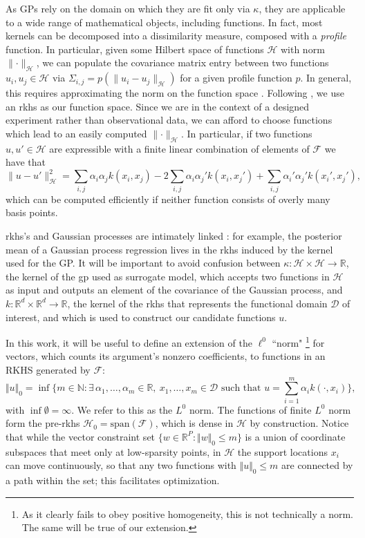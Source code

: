 \documentclass{article}
\newcommand{\N}{\mathbb{N}}
\newcommand{\R}{\mathbb{R}}
\newcommand{\D}{\mathcal{D}} %
\newcommand{\F}{\mathcal{F}}
\newcommand{\Hs}{\mathcal{H}}
\newcommand{\norm}[1]{\lVert #1 \rVert}
\newcommand{\kernelH}{k}
\newcommand{\kernelGP}{\kappa}
\newcommand{\vu}{u}
\begin{document}
As GPs rely on the domain on which they are fit only via $\kernelGP$, they are applicable to a wide range of mathematical objects, including functions.
In fact, most kernels can be decomposed into a dissimilarity measure, composed with a \emph{profile} function. In particular, given some Hilbert space of functions $\Hs$ with norm $\norm{\cdot}_\Hs$, we can populate the covariance matrix entry between two functions $\vu_i,\vu_j\in\Hs$ via $\Sigma_{i,j} = p(\norm{\vu_i - \vu_j}_\Hs)$ for a given profile function $p$.
In general, this requires approximating the norm on the function space \citep{muehlenstaedt2017computer,betancourt2020fungp,damiano2022automatic}.
Following \cite{vien2018bayesian}, we use an \gls{rkhs} as our function space.
Since we are in the context of a designed experiment rather than observational data, we can afford to choose functions which lead to an easily computed $\norm{\cdot}_\Hs$.
In particular, if two functions $\vu,\vu' \in \Hs$ are expressible with a finite linear combination of elements of $\F$ we have that 
\begin{equation}
\norm{\vu - \vu'}_\Hs^2 = \sum_{i,j} \alpha_i\alpha_j \kernelH(x_i,x_j) - 2\sum_{i,j} \alpha_i\alpha_j' \kernelH(x_i,x_j') + \sum_{i,j} \alpha_i'\alpha_j' \kernelH(x_i',x_j'),
\end{equation}
which can be computed efficiently if neither function consists of overly many basis points.

\gls{rkhs}'s and Gaussian processes are intimately linked \citep{kanagawa2018gaussian}: for example, the posterior mean of a Gaussian process regression lives in the \gls{rkhs} induced by the kernel used for the GP.
It will be important to avoid confusion between $\kernelGP: \Hs \times\Hs \to \R$, the kernel of the \gls{gp} used as surrogate model, which accepts two functions in $\Hs$ as input and outputs an element of the covariance of the Gaussian process, and $\kernelH:\R^d\times\R^d\to\R$, the kernel of the \gls{rkhs} that represents the functional domain $\D$ of interest, and which is used to construct our candidate functions $u$.

In this work, it will be useful to define an extension of the $\ell^0$ ``norm"
\footnote{As it clearly fails to obey positive homogeneity, this is not technically a norm. The same will be true of our extension.}
for vectors, which counts its argument's nonzero coefficients, to functions in an RKHS generated by $\F$:
\begin{equation}
    \Vert \vu \Vert_0 = \inf\Big\{ m \in \N : \exists\, \alpha_1,\ldots,\alpha_m \in \R,\ x_1,\ldots,x_m \in \D \text{ such that } \vu = \textstyle\sum_{i=1}^m \alpha_i \kernelH(\cdot, x_i) \Big\},
\end{equation}
with $\inf\emptyset = \infty$.
We refer to this as the $L^0$ norm.
The functions of finite $L^0$ norm form the pre-\gls{rkhs} $\Hs_0 = \textrm{span}(\F)$, which is dense in $\Hs$ by construction.
Notice that while the vector constraint set $\{w \in \R^P : \Vert w \Vert_0\leq m\}$ is a union of coordinate subspaces that meet only at low-sparsity points, in $\Hs$ the support locations $x_i$ can move continuously, so that any two functions with $\Vert \vu \Vert_0 \leq m$ are connected by a path within the set; this facilitates optimization.
\end{document}
